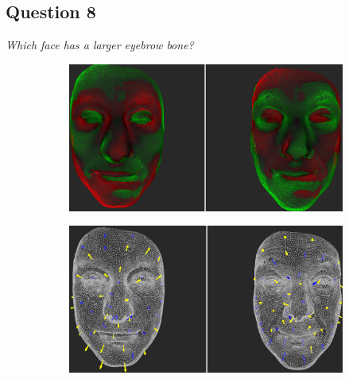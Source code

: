 \subsection{Question 8}
\label{attch:complete_study_results-question8}

\begin{center}{\it Which face has a larger eyebrow bone?}\end{center}

\begin{figure}[h]
\centering
\begin{subfigure}{0.49\textwidth}
\includegraphics[width=\textwidth]{./img-study/pair20.PNG}
\caption{}
\label{fig:study-7-20}
\end{subfigure}
\begin{subfigure}{0.49\textwidth}
\includegraphics[width=\textwidth]{./img-study/pair22.PNG}
\caption{}
\label{fig:study-7-22}
\end{subfigure}


\end{figure}
